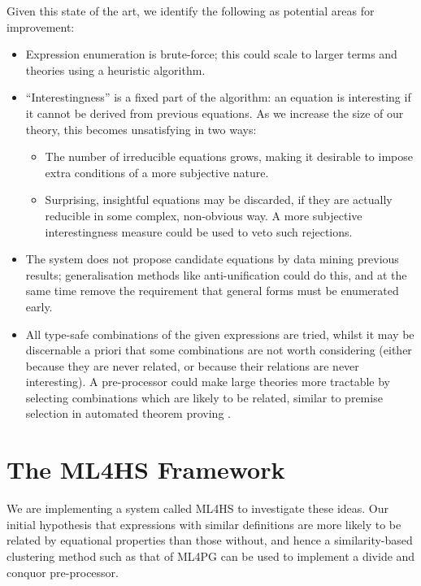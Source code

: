 \documentclass{eceasst}
\begin{document}
Given this state of the art, we identify the following as potential
areas for improvement:

\begin{itemize}
\item
  Expression enumeration is brute-force; this could scale to larger
  terms and theories using a heuristic algorithm.
\item
  ``Interestingness'' is a fixed part of the algorithm: an equation is
  interesting if it cannot be derived from previous equations. As we
  increase the size of our theory, this becomes unsatisfying in two
  ways:

  \begin{itemize}
  \item
    The number of irreducible equations grows, making it desirable to
    impose extra conditions of a more subjective nature.
  \item
    Surprising, insightful equations may be discarded, if they are
    actually reducible in some complex, non-obvious way. A more
    subjective interestingness measure could be used to veto such
    rejections.
  \end{itemize}
\item
  The system does not propose candidate equations by data mining
  previous results; generalisation methods like anti-unification could
  do this, and at the same time remove the requirement that general
  forms must be enumerated early.
\item
  All type-safe combinations of the given expressions are tried, whilst
  it may be discernable a priori that some combinations are not worth
  considering (either because they are never related, or because their
  relations are never interesting). A pre-processor could make large
  theories more tractable by selecting combinations which are likely to
  be related, similar to premise selection in automated theorem proving
  \cite{kuhlwein2012overview}.
\end{itemize}

\section{The \textsc{ML4HS} Framework}

We are implementing a system called \textsc{ML4HS} to investigate these
ideas. Our initial hypothesis that expressions with similar definitions
are more likely to be related by equational properties than those
without, and hence a similarity-based clustering method such as that of
\textsc{ML4PG} \cite{journals/corr/abs-1302-6421} can be used to implement
a divide and conquor pre-processor.
\end{document}
